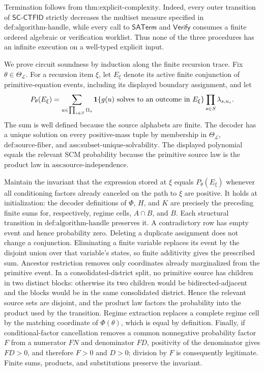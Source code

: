 Termination follows from \(\text{thm:explicit-complexity}\).  Indeed, every outer transition of \(\mathsf{SC\mbox{-}CTFID}\) strictly decreases the multiset measure specified in \(\text{def:algorithm-handle}\), while every call to \(\mathsf{SATerm}\) and \(\mathsf{Verify}\) consumes a finite ordered algebraic or verification worklist.  Thus none of the three procedures has an infinite execution on a well-typed explicit input.

We prove circuit soundness by induction along the finite recursion trace.  Fix \(\theta\in\Theta_{\mathcal L}\).  For a recursion item \(\xi\), let \(E_\xi\) denote its active finite conjunction of primitive-equation events, including its displayed boundary assignment, and let
\[
 P_\theta(E_\xi)
 =\sum_{u\in\prod_{s\in S}\Omega_s}
   {\bf 1}\{g(u)\text{ solves to an outcome in }E_\xi\}
   \prod_{s\in S}\lambda_{s,u_s}.
\]
The sum is well defined because the source alphabets are finite.  The decoder has a unique solution on every positive-mass tuple by membership in \(\Theta_{\mathcal L}\), \(\text{def:source-fiber}\), and \(\text{ass:subset-unique-solvability}\).  The displayed polynomial equals the relevant SCM probability because the primitive source law is the product law in \(\text{ass:source-independence}\).

Maintain the invariant that the expression stored at \(\xi\) equals \(P_\theta(E_\xi)\) whenever all conditioning factors already canceled on the path to \(\xi\) are positive.  It holds at initialization: the decoder definitions of \(\Phi\), \(H\), and \(K\) are precisely the preceding finite sums for, respectively, regime cells, \(A\cap B\), and \(B\).  Each structural transition in \(\text{def:algorithm-handle}\) preserves it.  A contradictory row has empty event and hence probability zero.  Deleting a duplicate assignment does not change a conjunction.  Eliminating a finite variable replaces its event by the disjoint union over that variable's states, so finite additivity gives the prescribed sum.  Ancestor restriction removes only coordinates already marginalized from the primitive event.  In a consolidated-district split, no primitive source has children in two distinct blocks: otherwise its two children would be bidirected-adjacent and the blocks would be in the same consolidated district.  Hence the relevant source sets are disjoint, and the product law factors the probability into the product used by the transition.  Regime extraction replaces a complete regime cell by the matching coordinate of \(\Phi(\theta)\), which is equal by definition.  Finally, if conditional-factor cancellation removes a common nonnegative probability factor \(F\) from a numerator \(FN\) and denominator \(FD\), positivity of the denominator gives \(FD>0\), and therefore \(F>0\) and \(D>0\); division by \(F\) is consequently legitimate.  Finite sums, products, and substitutions preserve the invariant.

